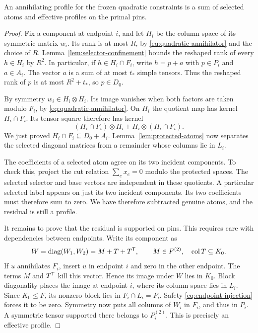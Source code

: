 \begin{lemma}\label{lem:joint-obstruction}
An annihilating profile for the frozen quadratic constraints is a sum of
selected atoms and effective profiles on the primal pins.
\end{lemma}
\begin{proof}
Fix a component at endpoint \(i\), and let \(H_i\) be the column
space of its symmetric matrix \(w_i\). Its rank is at most \(R\), by
\eqref{eq:quadratic-annihilator} and the choice of \(R\).
Lemma~\ref{lem:selector-confinement} bounds the reshaped rank of every
\(h\in H_i\) by \(R^2\). In particular, if \(h\in H_i\cap F_i\), write
\(h=p+a\) with \(p\in P_i\) and \(a\in A_i\). The vector \(a\) is a
sum of at most \(t_*\) simple tensors. Thus the reshaped rank of \(p\)
is at most \(R^2+t_*\), so \(p\in D_0\).

By symmetry \(w_i\in H_i\otimes H_i\). Its image vanishes when both
factors are taken modulo \(F_i\), by \eqref{eq:quadratic-annihilator}.
On \(H_i\) the quotient map has kernel \(H_i\cap F_i\). Its tensor
square therefore has kernel
\[
 (H_i\cap F_i)\otimes H_i+H_i\otimes(H_i\cap F_i).
\]
We just proved \(H_i\cap F_i\subseteq D_0+A_i\).
Lemma~\ref{lem:protected-atoms} now separates the selected diagonal
matrices from a remainder whose columns lie in \(L_i\).

The coefficients of a selected atom agree on its two incident components.
To check this, project the cut relation \(\sum_ex_e=0\) modulo the protected
spaces. The selected selector and base vectors are independent in these
quotients. A particular selected label appears on just its two incident
components. Its two coefficients must therefore sum to zero. We have
therefore subtracted genuine atoms, and the residual is still a profile.

It remains to prove that the residual is supported on pins. This requires
care with dependencies between endpoints. Write its component as
\[
 W=\operatorname{diag}(W_1,W_2)=M+T+T^{\mathsf T},
 \qquad M\in F^{(2)},\quad\operatorname{col}T\subseteq K_0.
\]
If \(u\) annihilates \(F_i\), insert \(u\) in endpoint \(i\) and zero
in the other endpoint. The terms \(M\) and \(T^{\mathsf T}\) kill this vector.
Hence its image under \(W\) lies in \(K_0\). Block diagonality places
the image at endpoint \(i\), where its column space lies in \(L_i\).
Since \(K_0\le F\), its nonzero block lies in
\(F_i\cap L_i=P_i\). Safety \eqref{eq:endpoint-injection} forces it to
be zero. Symmetry now puts all columns of \(W_i\) in \(F_i\), and thus
in \(P_i\). A symmetric tensor supported there belongs to \(P_i^{(2)}\).
This is precisely an effective profile.
\end{proof}

